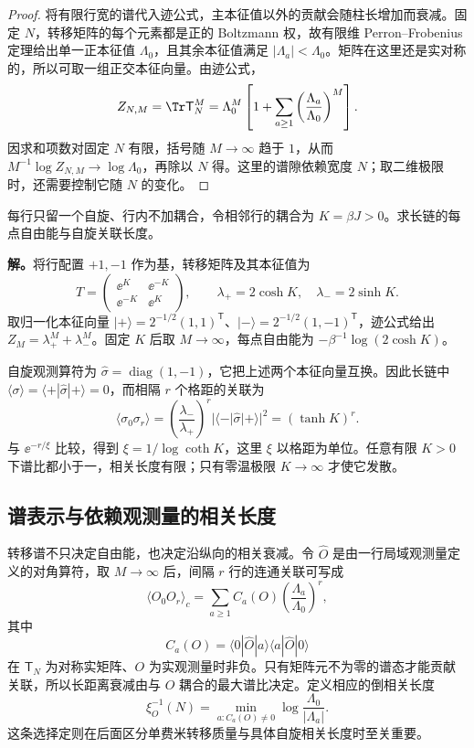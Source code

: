 \begin{proof}
将有限行宽的谱代入迹公式，主本征值以外的贡献会随柱长增加而衰减。固定 \(N\)，转移矩阵的每个元素都是正的 Boltzmann 权，故有限维 Perron--Frobenius 定理给出单一正本征值 \(\Lambda_0\)，且其余本征值满足 \(|\Lambda_a|<\Lambda_0\)。矩阵在这里还是实对称的，所以可取一组正交本征向量。由迹公式，
\[
Z_{N,M}
=\Tr\mathsf T_N^M
=\Lambda_0^M\left[
1+\sum_{a\ge1}\left(\frac{\Lambda_a}{\Lambda_0}\right)^M
\right].
\]
因求和项数对固定 \(N\) 有限，括号随 \(M\to\infty\) 趋于 \(1\)，从而
\(M^{-1}\log Z_{N,M}\to\log\Lambda_0\)，再除以 \(N\) 得。这里的谱隙依赖宽度 \(N\)；取二维极限时，还需要控制它随 \(N\) 的变化。
\end{proof}

\begin{workedexample}[无场链的主本征值与关联长度]
每行只留一个自旋、行内不加耦合，令相邻行的耦合为 $K=\beta J>0$。求长链的每点自由能与自旋关联长度。

\textbf{解。}将行配置 $+1,-1$ 作为基，转移矩阵及其本征值为
\[
T=\begin{pmatrix}\ee^K&\ee^{-K}\\\ee^{-K}&\ee^K\end{pmatrix},
\qquad
\lambda_+=2\cosh K,\quad\lambda_-=2\sinh K.
\]
取归一化本征向量 $|+\rangle=2^{-1/2}(1,1)^{\mathsf T}$、$|-\rangle=2^{-1/2}(1,-1)^{\mathsf T}$，迹公式给出 $Z_M=\lambda_+^M+\lambda_-^M$。固定 $K$ 后取 $M\to\infty$，每点自由能为 $-\beta^{-1}\log(2\cosh K)$。

自旋观测算符为 $\widehat\sigma=\operatorname{diag}(1,-1)$，它把上述两个本征向量互换。因此长链中 $\langle\sigma\rangle=\langle+|\widehat\sigma|+\rangle=0$，而相隔 $r$ 个格距的关联为
\[
 \langle\sigma_0\sigma_r\rangle
 =\left(\frac{\lambda_-}{\lambda_+}\right)^r
 |\langle-|\widehat\sigma|+\rangle|^2
 =(\tanh K)^r.
\]
与 $\ee^{-r/\xi}$ 比较，得到 $\xi=1/\log\coth K$，这里 $\xi$ 以格距为单位。任意有限 $K>0$ 下谱比都小于一，相关长度有限；只有零温极限 $K\to\infty$ 才使它发散。
\end{workedexample}

\subsection{谱表示与依赖观测量的相关长度}

转移谱不只决定自由能，也决定沿纵向的相关衰减。令 \(\widehat O\) 是由一行局域观测量定义的对角算符，取 \(M\to\infty\) 后，间隔 \(r\) 行的连通关联可写成
\begin{equation}
 \langle O_0O_r\rangle_c
 =\sum_{a\ge1}
 C_a(O)
 \left(\frac{\Lambda_a}{\Lambda_0}\right)^r,
 \label{eq:phys-sm-transfer-correlation-spectrum}
\end{equation}
其中
\[
 C_a(O)=
 \langle0|\widehat O|a\rangle
 \langle a|\widehat O|0\rangle
\]
在 \(\mathsf T_N\) 为对称实矩阵、$O$ 为实观测量时非负。只有矩阵元不为零的谱态才能贡献关联，所以长距离衰减由与 $O$ 耦合的最大谱比决定。定义相应的倒相关长度
\begin{equation}
 \xi_O^{-1}(N)
 =\min_{a:C_a(O)\neq0}
 \log\frac{\Lambda_0}{|\Lambda_a|}.
 \label{eq:phys-sm-observable-correlation-length}
\end{equation}
这条选择定则在后面区分单费米转移质量与具体自旋相关长度时至关重要。

